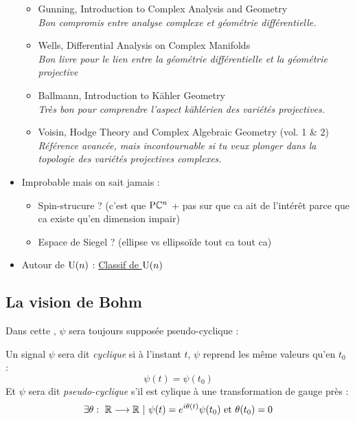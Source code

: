 \begin{itemize}
\begin{itemize}
		\item Gunning, Introduction to Complex Analysis and Geometry \\
		\textit{Bon compromis entre analyse complexe et géométrie différentielle.}
		
		\item Wells, Differential Analysis on Complex Manifolds \\
		\textit{Bon livre pour le lien entre la géométrie différentielle et la géométrie projective}
		
		\item Ballmann, Introduction to Kähler Geometry \\
		\textit{Très bon pour comprendre l’aspect kählérien des variétés projectives.}
		
		\item Voisin, Hodge Theory and Complex Algebraic Geometry (vol. 1 \& 2) \\
		\textit{Référence avancée, mais incontournable si tu veux plonger dans la topologie des variétés projectives complexes.}
	\end{itemize}
	
	\item Improbable mais on sait jamais :
	\begin{itemize}
		\item Spin-strucure ? (c'est que $\text{\normalfont P}\mathbb{C}^{n}$ + pas sur que ca ait de l'intérêt parce que ca existe qu'en dimension impair)
		
		\item Espace de Siegel ? (ellipse vs ellipsoïde tout ca tout ca)
	\end{itemize}
	
	\item Autour de $\text{\normalfont U}(n)$ : \href{https://en.wikipedia.org/wiki/Classifying_space_for_U(n)}{Classif de $\text{\normalfont U}(n)$}
	
\end{itemize}




\subsection{La vision de Bohm \cite[fig. 4.3]{bohm_geometric_2003}}
\label{subsec:lift_approch}

Dans cette , $\psi$ sera toujours supposée pseudo-cyclique :
\begin{definition}
	Un signal $\psi$ sera dit \emph{cyclique} si à l'instant $t$, $\psi$ reprend les même valeurs qu'en $t_0$ :
	\[\psi(t)=\psi(t_0)\]
	Et $\psi$ sera dit \emph{pseudo-cyclique} s'il est cylique à une transformation de gauge près :
	\[\exists \theta:\ \R\lr\R\ |\ \psi(t) = e^{i\theta(t)}\psi(t_0)\text{ et } \theta(t_0)=0\]
\end{definition}

